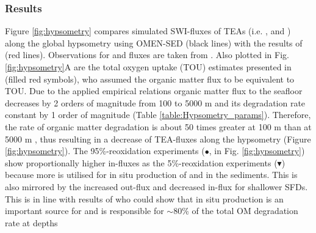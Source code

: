 \documentclass[gmd, manuscript]{copernicus}
\begin{document}
\subsubsection{Results}
Figure \ref{fig:hypsometry} compares simulated SWI-fluxes of TEAs (i.e. ,  and ) along the global hypsometry using OMEN-SED (black lines) with the results of \citet{thullner_global_scale_2009} 
(red lines). 
Observations for  and  fluxes are taken from \citet{middelburg_denitrification_1996}. Also plotted in Fig. \ref{fig:hypsometry}A are the total oxygen uptake (TOU) estimates presented in 
\citet{thullner_global_scale_2009} (filled red symbols), who assumed the organic matter flux to be equivalent to TOU. 
Due to the applied empirical relations organic matter flux to the seafloor decreases by 2 orders of magnitude from 100 to 5000 m and its degradation rate constant by 1 order of magnitude (Table \ref{table:Hypsometry_params}). 
Therefore, the rate of organic matter degradation is about 50 times greater at 100 m than at 5000 m \citep[compare][]{thullner_global_scale_2009}, thus resulting in a decrease of TEA-fluxes along the 
hypsometry (Figure \ref{fig:hypsometry}). 
The 95\%-reoxidation experiments ($\bullet$, in Fig. \ref{fig:hypsometry}) show proportionally higher  in-fluxes as the 5\%-reoxidation experiments ($\blacktriangledown$) because more  is utilised for 
in situ production of  and  in the sediments. This is also mirrored by the increased  out-flux and decreased  in-flux for shallower SFDs. 
This is in line with results of \citet{thullner_global_scale_2009} who could show that in situ production is an important source for  and is responsible for $\sim$80\% of the total OM degradation rate at depths 
\end{document}
